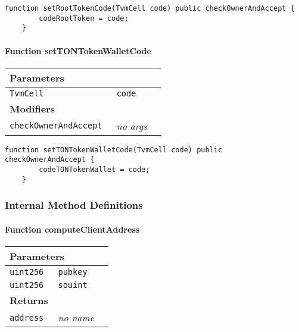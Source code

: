 \vspace{2cm}

\begin{lstlisting}[firstnumber=92]
	function setRootTokenCode(TvmCell code) public checkOwnerAndAccept {
		codeRootToken = code;
	}
\end{lstlisting}

\paragraph{Function setTONTokenWalletCode}


\ifsoltables
\noindent\begin{tabular}{|l|l|p{5cm}|}\hline
\multicolumn{3}{|l|}{\bf Parameters}\\\hline
\tt TvmCell & \tt code &\\\hline
\multicolumn{3}{|l|}{\bf Modifiers}\\\hline
\tt checkOwnerAndAccept & {\em no args} &\\\hline
\end{tabular}
\fi

\vspace{2cm}

\begin{lstlisting}[firstnumber=96]
	function setTONTokenWalletCode(TvmCell code) public checkOwnerAndAccept {
		codeTONTokenWallet = code;
	}
\end{lstlisting}

\subsubsection{Internal Method Definitions}


\paragraph{Function computeClientAddress}


\ifsoltables
\noindent\begin{tabular}{|l|l|p{5cm}|}\hline
\multicolumn{3}{|l|}{\bf Parameters}\\\hline
\tt uint256 & \tt pubkey &\\\hline
\tt uint256 & \tt souint &\\\hline
\multicolumn{3}{|l|}{\bf Returns}\\\hline
\tt address & {\em no name} &\\\hline
\end{tabular}
\fi

\vspace{2cm}

